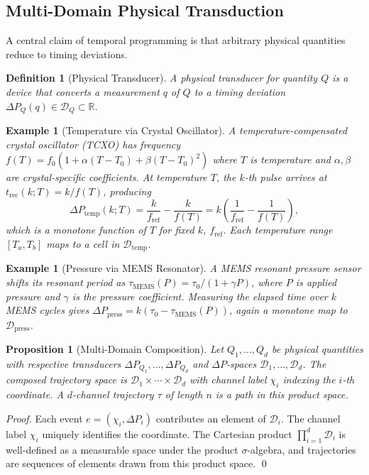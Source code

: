 \documentclass[twocolumn,10pt]{article}
\newtheorem{proposition}[theorem]{Proposition}
\newtheorem{definition}[theorem]{Definition}
\newtheorem{example}[theorem]{Example}
\newcommand{\DP}{\Delta P}          %
\newcommand{\trec}{t_{\mathrm{rec}}}
\newcommand{\fref}{f_{\mathrm{ref}}}
\newcommand{\calD}{\mathcal{D}}     %
\begin{document}
\subsection{Multi-Domain Physical Transduction}

A central claim of temporal programming is that arbitrary physical
quantities reduce to timing deviations.

\begin{definition}[Physical Transducer]
\label{def:transducer}
A \emph{physical transducer for quantity $Q$} is a device that
converts a measurement $q$ of $Q$ to a timing deviation
$\DP_Q(q) \in \calD_Q \subset \mathbb{R}$.
\end{definition}

\begin{example}[Temperature via Crystal Oscillator]
\label{ex:temp}
A temperature-compensated crystal oscillator (TCXO) has frequency
$f(T) = f_0(1 + \alpha(T - T_0) + \beta(T - T_0)^2)$ where $T$ is
temperature and $\alpha, \beta$ are crystal-specific coefficients.
At temperature $T$, the $k$-th pulse arrives at
$\trec(k; T) = k / f(T)$, producing
\begin{equation}
  \DP_{\mathrm{temp}}(k; T)
  = \frac{k}{\fref} - \frac{k}{f(T)}
  = k \left(\frac{1}{\fref} - \frac{1}{f(T)}\right),
  \label{eq:dp-temp}
\end{equation}
which is a monotone function of $T$ for fixed $k$, $\fref$. Each
temperature range $[T_a, T_b]$ maps to a cell in $\calD_{\mathrm{temp}}$.
\end{example}

\begin{example}[Pressure via MEMS Resonator]
\label{ex:press}
A MEMS resonant pressure sensor shifts its resonant period as
$\tau_{\mathrm{MEMS}}(P) = \tau_0 / (1 + \gamma P)$,
where $P$ is applied pressure and $\gamma$ is the pressure
coefficient. Measuring the elapsed time over $k$ MEMS cycles
gives $\DP_{\mathrm{press}} = k(\tau_0 - \tau_{\mathrm{MEMS}}(P))$,
again a monotone map to $\calD_{\mathrm{press}}$.
\end{example}

\begin{proposition}[Multi-Domain Composition]
\label{prop:multidom}
Let $Q_1, \ldots, Q_d$ be physical quantities with respective
transducers $\DP_{Q_1}, \ldots, \DP_{Q_d}$ and $\DP$-spaces
$\calD_1, \ldots, \calD_d$. The \emph{composed trajectory space} is
$\calD_1 \times \cdots \times \calD_d$ with channel label
$\chi_i$ indexing the $i$-th coordinate. A $d$-channel trajectory
$\tau$ of length $n$ is a path in this product space.
\end{proposition}
\begin{proof}
Each event $e = (\chi_i, \DP_i)$ contributes an element of $\calD_i$.
The channel label $\chi_i$ uniquely identifies the coordinate.
The Cartesian product $\prod_{i=1}^{d} \calD_i$ is well-defined as a
measurable space under the product $\sigma$-algebra, and trajectories
are sequences of elements drawn from this product space. \qed
\end{proof}
\end{document}
